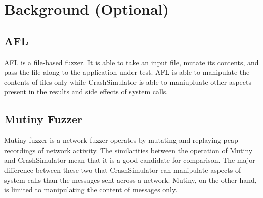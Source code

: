 \section{Background (Optional)}
\label{SEC:background}

\subsection{AFL}

AFL is a file-based fuzzer.  It is able to take an input file, mutate its
contents, and pass the file along to the application under test.  AFL is
able to manipulate the contents of files only while CrashSimulator is able
to maniupluate other aspects present in the results and side effects of
system calls.

\subsection{Mutiny Fuzzer}

Mutiny fuzzer is a network fuzzer operates by mutating and replaying pcap
recordings of network activity.  The similarities between the operation of
Mutiny and CrashSimulator mean that it is a good candidate for comparison.
The major difference between these two that CrashSimulator can manipulate
aspects of system calls than the messages sent across a network.  Mutiny,
on the other hand, is limited to manipulating the content of messages only.
